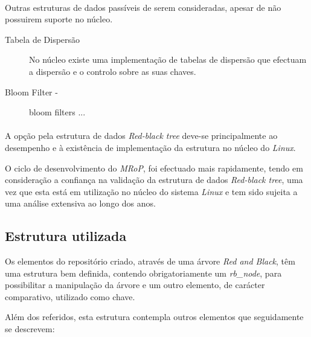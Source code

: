 \paragraph*{}
Outras estruturas de dados passíveis de serem consideradas, apesar de não possuirem suporte no núcleo.

\begin{description}
\item[Tabela de Dispersão]
No núcleo existe uma implementação de tabelas de dispersão que efectuam a dispersão e o controlo sobre as suas chaves.


\item[Bloom Filter - ]
bloom filters ...

\end{description}
\paragraph*{}
A opção pela estrutura de dados \textit{Red-black tree} deve-se principalmente ao desempenho e à existência de implementação da estrutura no núcleo do \textit{Linux}.

O ciclo de desenvolvimento do \textit{MRoP}, foi efectuado mais rapidamente, tendo em consideração a confiança na validação da estrutura de dados \textit{Red-black tree}, uma vez que esta está em utilização no núcleo do sistema \textit{Linux} e tem sido sujeita a uma análise extensiva ao longo dos anos.
 
\subsection{Estrutura utilizada}
\label{sub:repo_structure}

Os elementos do repositório criado, através de uma árvore \textit{Red and Black}, têm uma estrutura bem definida, contendo obrigatoriamente um \textit{rb\_node}, para possibilitar a manipulação da árvore e um outro elemento, de carácter comparativo, utilizado como chave.

Além dos referidos, esta estrutura contempla outros elementos que seguidamente se descrevem:

